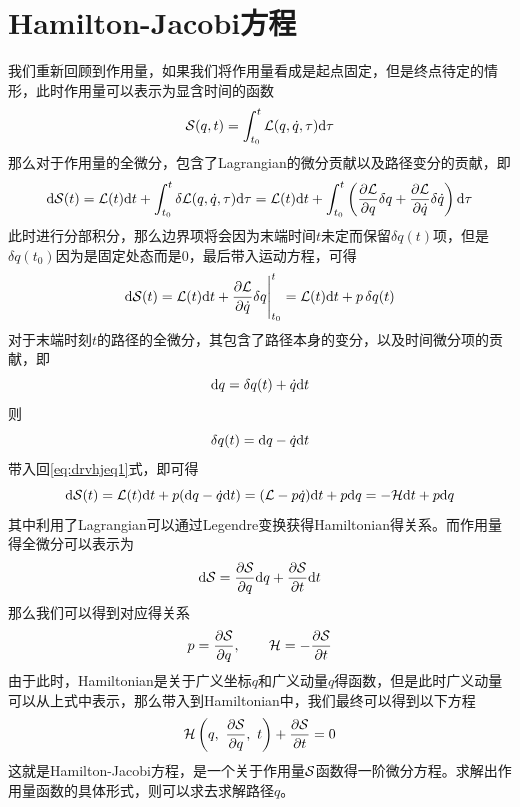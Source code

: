 \section{Hamilton-Jacobi方程}
\label{sec:Ham_Jacobi}
我们重新回顾到作用量，如果我们将作用量看成是起点固定，但是终点待定的情形，此时作用量可以表示为显含时间的函数
\begin{equation}
    \mathcal{S}(q,t) = \int_{t_0}^{t}\mathcal{L}(q,\dot q,\tau)\mathrm{d} \tau
\end{equation}
那么对于作用量的全微分，包含了Lagrangian的微分贡献以及路径变分的贡献，即
\begin{equation}
    \mathrm{d} \mathcal{S}(t) = \mathcal{L}(t)\mathrm{d} t + \int_{t_0}^{t}\delta\mathcal{L}(q,\dot q,\tau)\mathrm{d}\tau = \mathcal{L}(t)\mathrm{d} t + \int_{t_0}^{t}\left( \frac{\partial\mathcal{L}}{\partial q}\delta q + \frac{\partial\mathcal{L}}{\partial \dot q}\delta\dot q \right)\mathrm{d}\tau 
\end{equation}
此时进行分部积分，那么边界项将会因为末端时间$t$未定而保留$\delta q(t)$项，但是$\delta q(t_0)$因为是固定处态而是0，最后带入运动方程，可得
\begin{equation}
    \mathrm{d} \mathcal{S}(t) = \mathcal{L}(t)\mathrm{d} t+\frac{\partial\mathcal{L}}{\partial\dot q}\delta q\Bigg|^t_{t_0} = \mathcal{L}(t)\mathrm{d} t+p\,\delta q(t)\label{eq:drvhjeq1}
\end{equation}
对于末端时刻$t$的路径的全微分，其包含了路径本身的变分，以及时间微分项的贡献，即
\begin{equation}
    \mathrm{d} q =\delta q(t) + \dot q \mathrm{d} t 
\end{equation}
则
\begin{equation}
    \delta q(t) = \mathrm{d} q-\dot q \mathrm{d} t 
\end{equation}
带入回\eqref{eq:drvhjeq1}式，即可得
\begin{equation}
    \mathrm{d} \mathcal{S}(t) = \mathcal{L}(t)\mathrm{d} t+p( \mathrm{d} q-\dot q \mathrm{d} t ) = (\mathcal{L} - p\dot q)\mathrm{d} t + p\mathrm{d} q  = -\mathcal{H} \mathrm{d} t  +p\mathrm{d} q
\end{equation}
其中利用了Lagrangian可以通过Legendre变换获得Hamiltonian得关系。而作用量得全微分可以表示为
\begin{equation}
    \mathrm{d}\mathcal{S} = \frac{\partial\mathcal{S}}{\partial q}\mathrm{d} q + \frac{\partial\mathcal{S}}{\partial t}\mathrm{d} t
    \end{equation}
    那么我们可以得到对应得关系
    \begin{equation}
        p = \frac{\partial\mathcal{S}}{\partial q},\qquad \mathcal{H} = - \frac{\partial\mathcal{S}}{\partial t}
    \end{equation}
    由于此时，Hamiltonian是关于广义坐标$q$和广义动量$q$得函数，但是此时广义动量可以从上式中表示，那么带入到Hamiltonian中，我们最终可以得到以下方程
\begin{equation}
    \mathcal{H}\left(q,~\frac{\partial\mathcal{S}}{\partial q},~t\right) + \frac{\partial \mathcal{S}}{\partial t}=0
\end{equation}
这就是Hamilton-Jacobi方程，是一个关于作用量$\mathcal{S}$函数得一阶微分方程。求解出作用量函数的具体形式，则可以求去求解路径$q$。

